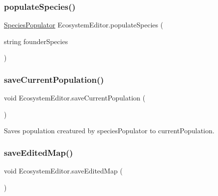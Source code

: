 \mbox{\label{class_ecosystem_editor_a3f0623c56b5399b02f6b18a72652a1ba}} 
\subsubsection{\texorpdfstring{populate\+Species()}{populateSpecies()}}
{\footnotesize\ttfamily \mbox{\hyperlink{class_species_populator}{Species\+Populator}} Ecosystem\+Editor.\+populate\+Species (\begin{DoxyParamCaption}\item[{string}]{founder\+Species }\end{DoxyParamCaption})}

\mbox{\label{class_ecosystem_editor_a5df7d2d657419e3a35f2b55973f7c6ef}} 
\subsubsection{\texorpdfstring{save\+Current\+Population()}{saveCurrentPopulation()}}
{\footnotesize\ttfamily void Ecosystem\+Editor.\+save\+Current\+Population (\begin{DoxyParamCaption}{ }\end{DoxyParamCaption})}



Saves population creatured by species\+Populator to current\+Population. 

\mbox{\label{class_ecosystem_editor_a561f235d70f14111eba609e5d5ea869b}} 
\subsubsection{\texorpdfstring{save\+Edited\+Map()}{saveEditedMap()}}
{\footnotesize\ttfamily void Ecosystem\+Editor.\+save\+Edited\+Map (\begin{DoxyParamCaption}{ }\end{DoxyParamCaption})}

